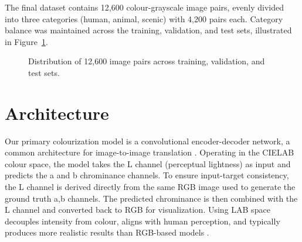 \documentclass{article} %
\begin{document}
The final dataset contains 12{,}600 colour-grayscale image pairs, evenly divided into three categories (human, animal, scenic) with 4{,}200 pairs each. Category balance was maintained across 
the training, validation, and test sets, illustrated in Figure~\ref{fig:data_split}. 

\begin{figure}[h]
\centering
{}
\caption{Distribution of 12{,}600 image pairs across training, validation, and test sets.}
\label{fig:data_split}
\end{figure}

\section{Architecture}

Our primary colourization model is a convolutional encoder-decoder network, a common architecture for image-to-image translation \citep{leatvanich2025image}. Operating in the CIELAB colour 
space, the model takes the L channel (perceptual lightness) as input and predicts the a and b chrominance channels. To ensure input-target consistency, the L channel is derived directly 
from the same RGB image used to generate the ground truth a,b channels. The predicted chrominance is then combined with the L channel and converted back to RGB for visualization. Using 
LAB space decouples intensity from colour, aligns with human perception, and typically produces more realistic results than RGB-based models \citep{leatvanich2025image}.
\end{document}

